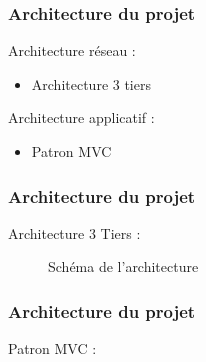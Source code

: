 \begin{frame}
  \frametitle{Architecture du projet}
	
  Architecture réseau :
      \begin{itemize}
        \item Architecture 3 tiers
      \end{itemize}
  Architecture applicatif :
      \begin{itemize}
        \item Patron MVC
      \end{itemize}
\end{frame}

\begin{frame}
  \frametitle{Architecture du projet}
  
  Architecture 3 Tiers :
  
  \begin{figure}[!h]
	\begin{center}
	
	\caption{\label{archi_schema} Schéma de l'architecture}
	\end{center}
  \end{figure}

\end{frame}




\begin{frame}
  \frametitle{Architecture du projet}
  
	Patron MVC :
\end{frame}